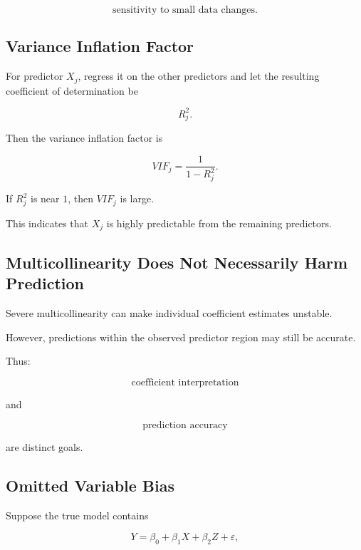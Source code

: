 \[
\boxed{
\text{sensitivity to small data changes}.
}
\]

\subsection{Variance Inflation Factor}
\label{subsec:variance-inflation-factor}

For predictor \(X_j\), regress it on the other predictors and let the
resulting coefficient of determination be

\[
R_j^2.
\]

Then the variance inflation factor is

\[
\boxed{
VIF_j
=
\frac1{
1-R_j^2
}.
}
\]

If \(R_j^2\) is near \(1\), then \(VIF_j\) is large.

This indicates that \(X_j\) is highly predictable from the remaining
predictors.

\subsection{Multicollinearity Does Not Necessarily Harm Prediction}
\label{subsec:multicollinearity-prediction}

Severe multicollinearity can make individual coefficient estimates
unstable.

However, predictions within the observed predictor region may still be
accurate.

Thus:

\[
\boxed{
\text{coefficient interpretation}
}
\]

and

\[
\boxed{
\text{prediction accuracy}
}
\]

are distinct goals.

\subsection{Omitted Variable Bias}
\label{subsec:omitted-variable-bias}

Suppose the true model contains

\[
Y
=
\beta_0+\beta_1X+\beta_2Z+\varepsilon,
\]

